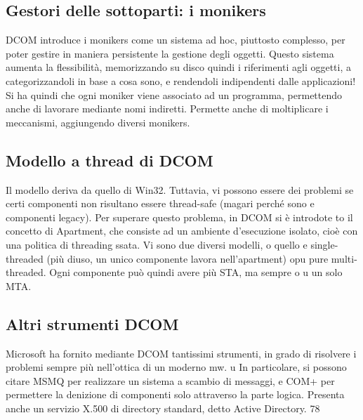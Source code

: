 \documentclass[a4paper,12pt]{article}
\begin{document}
\subsection{Gestori delle sottoparti: i monikers}
DCOM introduce i monikers come un sistema ad hoc, piuttosto complesso, per
poter gestire in maniera persistente la gestione degli oggetti. Questo sistema
aumenta la flessibilità, memorizzando su disco quindi i riferimenti agli oggetti,
a
categorizzandoli in base a cosa sono, e rendendoli indipendenti dalle applicazioni!
Si ha quindi che ogni moniker viene associato ad un programma, permettendo
anche di lavorare mediante nomi indiretti. Permette anche di moltiplicare i
meccanismi, aggiungendo diversi monikers.
\subsection{Modello a thread di DCOM}
Il modello deriva da quello di Win32. Tuttavia, vi possono essere dei problemi se certi componenti non risultano essere
thread-safe (magari perché sono
e
componenti legacy). Per superare questo problema, in DCOM si è introdote
to il concetto di Apartment, che consiste ad un ambiente d'esecuzione isolato,
cioè con una politica di threading ssata. Vi sono due diversi modelli, o quello
e
single-threaded (più diuso, un unico componente lavora nell'apartment) opu
pure multi-threaded. Ogni componente può quindi avere più STA, ma sempre
o
u
un solo MTA.
\subsection{Altri strumenti DCOM}
Microsoft ha fornito mediante DCOM tantissimi strumenti, in grado di risolvere
i problemi sempre più nell'ottica di un moderno mw.
u
In particolare, si possono citare MSMQ per realizzare un sistema a scambio di
messaggi, e COM+ per permettere la denizione di componenti solo attraverso
la parte logica. Presenta anche un servizio X.500 di directory standard, detto
Active Directory.
78
\end{document}
